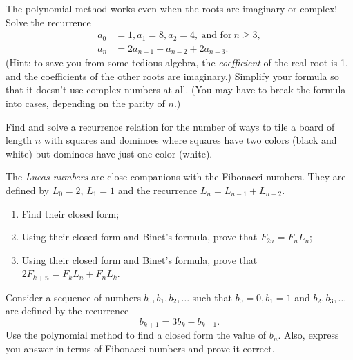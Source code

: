 \documentclass[12pt,letterpaper]{hmcpset}
\renewcommand{\t}[1]{\text{#1}}
\begin{document}
\begin{problem}[9]
    The polynomial  method works even when the roots are imaginary or complex! Solve the recurrence
        \begin{align*}
            a_0&=1,a_1=8,a_2=4,~\t{and for}~n\geq3,\\
            a_n&=2a_{n-1}-a_{n-2}+2a_{n-3}.
        \end{align*}
    (Hint: to save you from some tedious algebra, the \textit{coefficient} of the real root is 1, and the coefficients of the other roots are imaginary.)  Simplify your formula so that it doesn't use complex numbers at all.  (You may have to break the formula into cases, depending on the parity of $n$.)
\end{problem}
\begin{solution}
    \vfill
\end{solution}
\newpage

\begin{problem}[10]
    Find and solve a recurrence relation for the number of ways to tile a board of length $n$ with squares and dominoes where squares have two colors (black and white) but dominoes have just one color (white).
\end{problem}
\begin{solution}
    \vfill
\end{solution}
\newpage

\begin{problem}[11]
    The \textit{Lucas numbers} are close companions with the Fibonacci numbers. They are defined by $L_0=2$, $L_1=1$ and the recurrence $L_n=L_{n-1}+L_{n-2}$.
    \begin{enumerate}
        \item Find their closed form;
        \item Using their closed form and Binet's formula, prove that $F_{2n}=F_nL_n$;
        \item Using their closed form and Binet's formula, prove that $2F_{k+n}=F_kL_n+F_nL_k$.
    \end{enumerate}
\end{problem}
\begin{solution}
    \vfill
\end{solution}
\newpage

\begin{problem}[12]
    Consider a sequence of numbers $b_0,b_1,b_2,\ldots$ such that $b_0=0, b_1=1$ and $b_2, b_3,\ldots$ are defined by the recurrence
    \[
        b_{k+1}=3b_k-b_{k-1}.
    \]
    Use the polynomial method to find a closed form the value of $b_n$. Also, express you answer in terms of Fibonacci numbers and prove it correct.
\end{problem}
\begin{solution}
    \vfill
\end{solution}
\newpage
\end{document}

